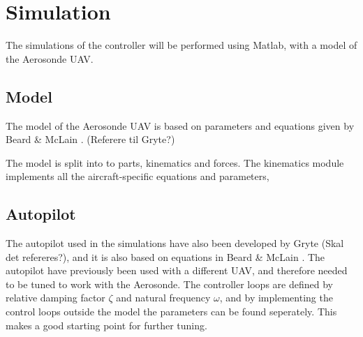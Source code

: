 \section{Simulation}
\label{ch:simulation}

The simulations of the controller will be performed using Matlab, with a model of the Aerosonde UAV. 

\subsection{Model}

The model of the Aerosonde UAV is based on parameters and equations given by Beard \& McLain \cite{suaBEARD}. (Referere til Gryte?)

The model is split into to parts, kinematics and forces. The kinematics module implements all the aircraft-specific equations and parameters, 


\subsection{Autopilot}

The autopilot used in the simulations have also been developed by Gryte (Skal det refereres?), and it is also based on equations in Beard \& McLain \cite{suaBEARD}. The autopilot have previously been used with a different UAV, and therefore needed to be tuned to work with the Aerosonde. The controller loops are defined by relative damping factor $\zeta$ and natural frequency $\omega$, and by implementing the control loops outside the model the parameters can be found seperately. This makes a good starting point for further tuning.